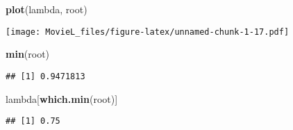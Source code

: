 \documentclass[
]{article}
\newenvironment{Shaded}{\begin{snugshade}}{\end{snugshade}}
\newcommand{\KeywordTok}[1]{\textcolor[rgb]{0.13,0.29,0.53}{\textbf{#1}}}
\newcommand{\NormalTok}[1]{#1}
\begin{document}
\begin{Shaded}
\begin{Highlighting}[]
\KeywordTok{plot}\NormalTok{(lambda, root)}
\end{Highlighting}
\end{Shaded}

\texttt{[image: MovieL\_files/figure-latex/unnamed-chunk-1-17.pdf]}

\begin{Shaded}
\begin{Highlighting}[]
\KeywordTok{min}\NormalTok{(root)}
\end{Highlighting}
\end{Shaded}

\begin{verbatim}
## [1] 0.9471813
\end{verbatim}

\begin{Shaded}
\begin{Highlighting}[]
\NormalTok{lambda[}\KeywordTok{which.min}\NormalTok{(root)]}
\end{Highlighting}
\end{Shaded}

\begin{verbatim}
## [1] 0.75
\end{verbatim}
\end{document}
